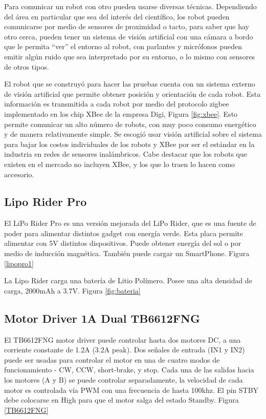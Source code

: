Para comunicar un robot con otro pueden usarse diversas técnicas. Dependiendo del área en particular que sea del interés del científico, los robot pueden comunicarse por medio de sensores de proximidad o tacto, para saber que hay otro cerca, pueden tener un sistema de visión artificial con una cámara a bordo que le permita “ver” el entorno al robot, con parlantes y micrófonos pueden emitir algún ruido que sea interpretado por su entorno, o lo mismo con sensores de otros tipos.

El robot que se construyó para hacer las pruebas cuenta con un sistema externo de visión artificial que permite obtener posición y orientación de cada robot. Esta información es transmitida a cada robot por medio del protocolo zigbee implementado en los chip XBee de la empresa Digi, Figura \ref{fig:xbee}. Esto permite comunicar un alto número de robots, con muy poco consumo energético y de manera relativamente simple. Se escogió usar visión artificial sobre el sistema para bajar los costos individuales de los robots y XBee por ser el estándar en la industria en redes de sensores inalámbricos. Cabe destacar que los robots que existen en el mercado no incluyen XBee, y los que lo traen lo hacen como accesorio. 


\subsection{Lipo Rider Pro}

El LiPo Rider Pro es una versión mejorada del LiPo Rider, que es una fuente de poder para alimentar distintos gadget con energía verde. Esta placa permite alimentar con 5V distintos dispositivos. Puede obtener energía del sol o por medio de inducción magnética. También puede cargar un SmartPhone. Figura \ref{lipopro1}

La Lipo Rider carga una batería de Litio Polímero. Posee una alta densidad de carga, 2000mAh a 3.7V. Figura \ref{fig:bateria}


\subsection{Motor Driver 1A Dual TB6612FNG}
El TB6612FNG motor driver puede controlar hasta dos motores DC, a una corriente constante de 1.2A (3.2A peak). Dos señales de entrada (IN1 y IN2) puede ser usadas para controlar el motor en una de cuatro modos de funcionamiento - CW, CCW, short-brake, y stop. Cada una de las salidas hacia los motores (A y B) se puede controlar separadamente, la velocidad de cada motor es controlada vía PWM con una frecuencia de hasta 100khz. El pin STBY debe colocarse en High para que el motor salga del estado Standby. Figura \ref{TB6612FNG}

